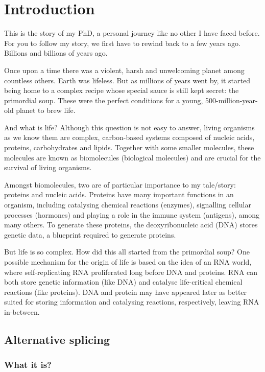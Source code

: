 \chapter{Introduction}

This is the story of my PhD, a personal journey like no other I have faced before. For you to follow my story, we first have to rewind back to a few years ago. Billions and billions of years ago.

Once upon a time there was a violent, harsh and unwelcoming planet among countless others. Earth was lifeless. But as millions of years went by, it started being home to a complex recipe whose special sauce is still kept secret: the primordial soup. These were the perfect conditions for a young, 500-million-year-old planet to brew life.

And what is life? Although this question is not easy to answer, living organisms as we know them are complex, carbon-based systems composed of nucleic acids, proteins, carbohydrates and lipids. Together with some smaller molecules, these molecules are known as biomolecules (biological molecules) and are crucial for the survival of living organisms.

Amongst biomolecules, two are of particular importance to my tale/story: proteins and nucleic acids. Proteins have many important functions in an organism, including catalysing chemical reactions (enzymes), signalling cellular processes (hormones) and playing a role in the immune system (antigens), among many others. To generate these proteins, the deoxyribonucleic acid (DNA) stores genetic data, a blueprint required to generate proteins.

But life is so complex. How did this all started from the primordial soup? One possible mechanism for the origin of life is based on the idea of an RNA world, where self-replicating RNA proliferated long before DNA and proteins. RNA can both store genetic information (like DNA) and catalyse life-critical chemical reactions (like proteins). DNA and protein may have appeared later as better suited for storing information and catalysing reactions, respectively, leaving RNA in-between.

\section{Alternative splicing}

\subsection{What it is?}

